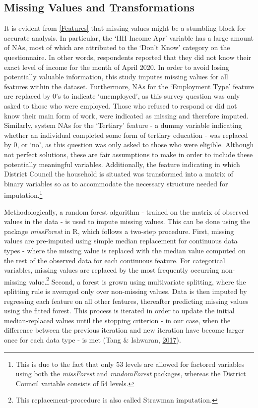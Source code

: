 \documentclass[11pt,preprint, authoryear]{elsarticle}
\numberwithin{equation}{section}
\numberwithin{figure}{section}
\numberwithin{table}{section}
\let\rmarkdownfootnote\footnote%
\def\footnote{\protect\rmarkdownfootnote}
\begin{document}
\hypertarget{missing-values-and-transformations}{%
\subsection*{Missing Values and
Transformations}\label{missing-values-and-transformations}}

It is evident from \ref{Features} that missing values might be a
stumbling block for accurate analysis. In particular, the `HH Income
Apr' variable has a large amount of NAs, most of which are attributed to
the `Don't Know' category on the questionnaire. In other words,
respondents reported that they did not know their exact level of income
for the month of April 2020. In order to avoid losing potentially
valuable information, this study imputes missing values for all features
within the dataset. Furthermore, NAs for the `Employment Type' feature
are replaced by 0's to indicate `unemployed', as this survey question
was only asked to those who were employed. Those who refused to respond
or did not know their main form of work, were indicated as missing and
therefore imputed. Similarly, system NAs for the `Tertiary' feature - a
dummy variable indicating whether an individual completed some form of
tertiary education - was replaced by 0, or `no', as this question was
only asked to those who were eligible. Although not perfect solutions,
these are fair assumptions to make in order to include these potentially
meaningful variables. Additionally, the feature indicating in which
District Council the household is situated was transformed into a matrix
of binary variables so as to accommodate the necessary structure needed
for imputation.\footnote{This is due to the fact that only 53 levels are
  allowed for factored variables using both the \emph{missForest} and
  \emph{randomForest} packages, whereas the District Council variable
  consists of 54 levels.}

Methodologically, a random forest algorithm - trained on the matrix of
observed values in the data - is used to impute missing values. This can
be done using the package \emph{missForest} in R, which follows a
two-step procedure. First, missing values are pre-imputed using simple
median replacement for continuous data types - where the missing value
is replaced with the median value computed on the rest of the observed
data for each continuous feature. For categorical variables, missing
values are replaced by the most frequently occurring non-missing
value.\footnote{This replacement-procedure is also called Strawman
  imputation.} Second, a forest is grown using multivariate splitting,
where the splitting rule is averaged only over non-missing values. Data
is then imputed by regressing each feature on all other features,
thereafter predicting missing values using the fitted forest. This
process is iterated in order to update the initial median-replaced
values until the stopping criterion - in our case, when the difference
between the previous iteration and new iteration have become larger once
for each data type - is met (Tang \& Ishwaran,
\protect\hyperlink{ref-tang2017random}{2017}).
\end{document}

